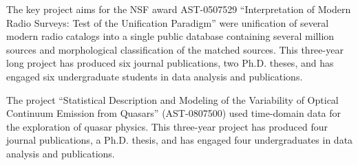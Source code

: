 The key project aims for the NSF award AST-0507529 ``Interpretation of Modern Radio 
Surveys: Test of the Unification Paradigm'' were unification of several modern radio 
catalogs into a single public database containing several million sources and 
morphological classification of the matched sources. This three-year long project has 
produced six journal publications, two Ph.D. theses, and has engaged six undergraduate 
students in data analysis and publications. 

The project ``Statistical Description and Modeling of the Variability of Optical Continuum 
Emission from Quasars'' (AST-0807500) used time-domain data for the exploration of quasar 
physics. This three-year project has produced four journal publications, a Ph.D. thesis, and has 
engaged four undergraduates in data analysis and publications. 

 


